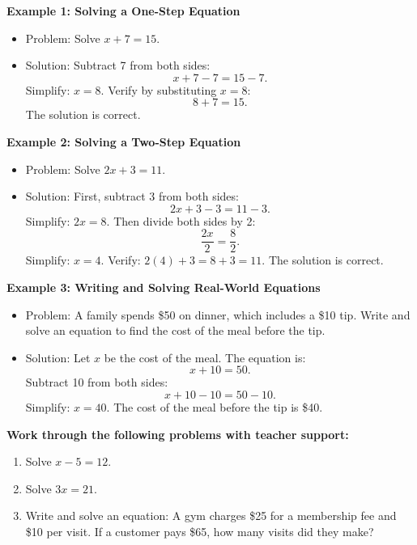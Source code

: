 \documentclass[12pt]{article}
\begin{document}
\begin{tcolorbox}[colframe=black!60, colback=white, 
coltitle=black, colbacktitle=black!15, fonttitle=\bfseries\Large, 
title=Examples, halign title=center, left=10pt, right=10pt, top=10pt, bottom=15pt]
\textbf{Example 1: Solving a One-Step Equation}
\begin{itemize}
    \item Problem: Solve \( x + 7 = 15 \).
    \item Solution: Subtract 7 from both sides: 
    \[
    x + 7 - 7 = 15 - 7.
    \]
    Simplify: \( x = 8 \). Verify by substituting \( x = 8 \): 
    \[
    8 + 7 = 15.
    \]
    The solution is correct.
\end{itemize}

\textbf{Example 2: Solving a Two-Step Equation}
\begin{itemize}
    \item Problem: Solve \( 2x + 3 = 11 \).
    \item Solution: First, subtract 3 from both sides:
    \[
    2x + 3 - 3 = 11 - 3.
    \]
    Simplify: \( 2x = 8 \). Then divide both sides by 2:
    \[
    \frac{2x}{2} = \frac{8}{2}.
    \]
    Simplify: \( x = 4 \). Verify: \( 2(4) + 3 = 8 + 3 = 11 \). The solution is correct.
\end{itemize}

\textbf{Example 3: Writing and Solving Real-World Equations}
\begin{itemize}
    \item Problem: A family spends \$50 on dinner, which includes a \$10 tip. Write and solve an equation to find the cost of the meal before the tip.
    \item Solution: Let \( x \) be the cost of the meal. The equation is:
    \[
    x + 10 = 50.
    \]
    Subtract 10 from both sides:
    \[
    x + 10 - 10 = 50 - 10.
    \]
    Simplify: \( x = 40 \). The cost of the meal before the tip is \$40.
\end{itemize}
\end{tcolorbox}

\begin{tcolorbox}[colframe=black!60, colback=white, 
coltitle=black, colbacktitle=black!15, fonttitle=\bfseries\Large, 
title=Guided Practice, halign title=center, left=10pt, right=10pt, top=10pt, bottom=45pt]
\textbf{Work through the following problems with teacher support:}
\begin{enumerate}[itemsep=3em]
    \item Solve \( x - 5 = 12 \). 
    \item Solve \( 3x = 21 \). 
    \item Write and solve an equation: A gym charges \$25 for a membership fee and \$10 per visit. If a customer pays \$65, how many visits did they make?
\end{enumerate}
\end{tcolorbox}
\end{document}
